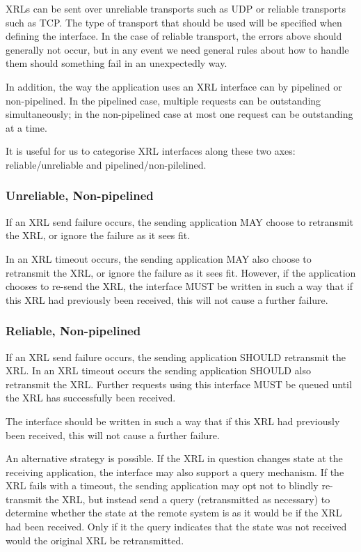 \documentclass[11pt]{article}
\begin{document}
XRLs can be sent over unreliable transports such as UDP or reliable
transports such as TCP. The type of transport that should be used will
be specified when defining the interface. In the case of reliable
transport, the errors above should generally not occur, but in any
event we need general rules about how to handle them should something
fail in an unexpectedly way.

In addition, the way the application uses an XRL interface can by
pipelined or non-pipelined.  In the pipelined case, multiple requests
can be outstanding simultaneously; in the non-pipelined case at most
one request can be outstanding at a time.

It is useful for us to categorise XRL interfaces along these two axes:
reliable/unreliable and pipelined/non-pilelined.

\subsubsection*{Unreliable, Non-pipelined}

If an XRL send failure occurs, the sending application MAY choose to
retransmit the XRL, or ignore the failure as it sees fit.  

In an XRL timeout occurs, the sending application MAY also choose to
retransmit the XRL, or ignore the failure as it sees fit.  However, if
the application chooses to re-send the XRL, the interface MUST be
written in such a way that if this XRL had previously been received,
this will not cause a further failure.

\subsubsection*{Reliable, Non-pipelined}

If an XRL send failure occurs, the sending application SHOULD
retransmit the XRL.  In an XRL timeout occurs the sending application
SHOULD also retransmit the XRL.  Further requests using this interface
MUST be queued until the XRL has successfully been received.

The interface should be written in such a way that if this XRL had
previously been received, this will not cause a further failure.

An alternative strategy is possible.  If the XRL in question changes
state at the receiving application, the interface may also support a
query mechanism.  If the XRL fails with a timeout, the sending
application may opt not to blindly re-transmit the XRL, but instead
send a query (retransmitted as necessary) to determine whether the
state at the remote system is as it would be if the XRL had been
received.  Only if it the query indicates that the state was not
received would the original XRL be retransmitted.
\end{document}
